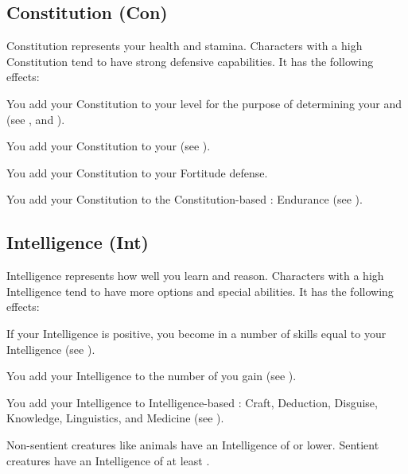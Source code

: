     \subsection{Constitution (Con)}\label{Constitution}
        {
            Constitution represents your health and stamina.
            Characters with a high Constitution tend to have strong defensive capabilities.
            It has the following effects:
            \begin{raggeditemize}
                \item You add your Constitution to your level for the purpose of determining your  and  (see , and ).
                \item You add your Constitution to your  (see ).
                \item You add your Constitution to your Fortitude defense.
                \item You add your Constitution to the Constitution-based : Endurance (see ).
            \end{raggeditemize}
        }

    \subsection{Intelligence (Int)}\label{Intelligence}
        {
            Intelligence represents how well you learn and reason.
            Characters with a high Intelligence tend to have more options and special abilities.
            It has the following effects:

            \begin{raggeditemize}
                \item If your Intelligence is positive, you become  in a number of skills equal to your Intelligence (see ).
                \item You add your Intelligence to the number of  you gain (see ).
                \item You add your Intelligence to Intelligence-based : Craft, Deduction, Disguise, Knowledge, Linguistics, and Medicine (see ).
            \end{raggeditemize}

            \par Non-sentient creatures like animals have an Intelligence of  or lower.
            Sentient creatures have an Intelligence of at least .
        }

